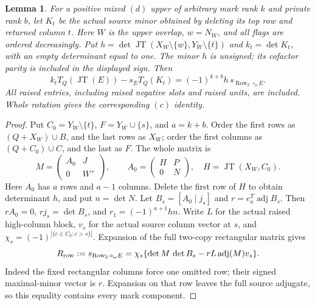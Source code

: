 \documentclass[11pt,a4paper]{amsart}
\numberwithin{equation}{section}
\theoremstyle{plain}
\newtheorem{lemma}[theorem]{Lemma}
\theoremstyle{definition}
\newcommand{\Row}{\operatorname{Row}}
\newcommand{\JT}{\operatorname{JT}}
\begin{document}
\begin{lemma}\label{ph:mixed-compound}
For a positive mixed \((d)\) upper of arbitrary mark rank \(k\) and
private rank \(b\), let \(K_t\) be the actual source minor obtained by
deleting its top row and returned column \(t\).
Here \(W\) is the upper overlap, \(w=N_W\), and all flags are ordered
decreasingly.  Put
\(h=\det\JT(X_W\setminus\{w\},Y_W\setminus\{t\})\) and
\(k_t=\det K_t\), with an empty determinant equal to one.
The minor \(h\) is unsigned; its cofactor parity is included in the
displayed sign.  Then
\[
 k_t T_Q(\JT(E))-s_E T_Q(K_t)
          =(-1)^{k+b}h\,s_{\Row_2\circ_\omega E}.
\]
All raised entries, including raised negative slots and raised units,
are included.  Whole rotation gives the corresponding \((c)\) identity.
\end{lemma}
\begin{proof}
Put \(C_0=Y_W\setminus\{t\}\), \(F=Y_W\cup\{s\}\), and \(a=k+b\).
Order the first rows as \((Q+X_W)\cup B\), and the last rows as \(X_W\);
order the first columns as \((Q+C_0)\cup C\), and the last as \(F\).
The whole matrix is
\[
 M=\begin{pmatrix}A_0&J\\0&W^+\end{pmatrix},
 \qquad
 A_0=\begin{pmatrix}H&P\\0&N\end{pmatrix},
 \quad H=\JT(X_W,C_0).
\]
Here \(A_0\) has \(a\) rows and \(a-1\) columns.  Delete the first row
of \(H\) to obtain determinant \(h\), and put \(n=\det N\).
Let \(B_s=[A_0\mid j_s]\) and
\(r=e_a^T\operatorname{adj}B_s\).  Then
\(rA_0=0\), \(rj_s=\det B_s\), and
\(r_1=(-1)^{a+1}hn\).
Write \(L\) for the actual raised high-column block, \(v_s\) for the
actual source column vector at \(s\), and
\(\chi_s=(-1)^{|\{c\in C_0:c>s\}|}\).
Expansion of the full two-copy rectangular matrix gives
\[
 R_{\rm row}:=s_{\Row_2\circ_\omega E}
       =\chi_s\{\det M\,\det B_s-rL\operatorname{adj}(M)v_s\}.
\]
Indeed the fixed rectangular columns force one omitted row; their
signed maximal-minor vector is \(r\).  Expansion on that row leaves
the full source adjugate, so this equality contains every mark component.


\end{proof}
\end{document}
